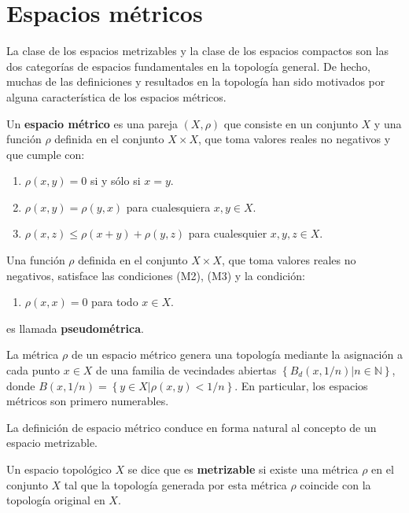 \documentclass[12pt]{report}
\theoremstyle{largebreak}
\renewcommand{\theenumi}{\arabic{enumi})}
\begin{document}
    \section{Espacios métricos}

    La clase de los espacios metrizables y la clase de los espacios compactos son las dos categorías de espacios fundamentales en la topología general. De hecho, muchas de las definiciones y resultados en la topología han sido motivados por alguna característica de los espacios métricos.

    \begin{mydef}
        Un \textbf{espacio métrico} es una pareja $(X,\rho)$ que consiste en un conjunto $X$ y una función $\rho$ definida en el conjunto $X\times X$, que toma valores reales no negativos y que cumple con:
        \renewcommand{\theenumi}{M\arabic{enumi})}
        \begin{enumerate}
            \item $\rho(x,y)=0$ si y sólo si $x=y$.
            \item $\rho(x,y)=\rho(y,x)$ para cualesquiera $x,y\in X$.
            \item $\rho(x,z)\leq\rho(x+y)+\rho(y,z)$ para cualesquier $x,y,z\in X$.
        \end{enumerate}
        Una función $\rho$ definida en el conjunto $X\times X$, que toma valores reales no negativos, satisface las condiciones (M2), (M3) y la condición:
        \renewcommand{\theenumi}{M\arabic{enumi}')}
        \begin{enumerate}
            \item $\rho(x,x)=0$ para todo $x\in X$.
        \end{enumerate}
        es llamada \textbf{pseudométrica}.
    \end{mydef}

    \renewcommand{\theenumi}{\arabic{enumi})}

    La métrica $\rho$ de un espacio métrico genera una topología mediante la asignación a cada punto $x\in X$ de una familia de vecindades abiertas $\left\{B_d(x,1/n)\big| n\in\mathbb{N} \right\}$, donde $B(x,1/n)=\left\{y\in X\big| \rho(x,y)<1/n \right\}$. En particular, los espacios métricos son primero numerables.

    La definición de espacio métrico conduce en forma natural al concepto de un espacio metrizable.

    \begin{mydef}
        Un espacio topológico $X$ se dice que es \textbf{metrizable} si existe una métrica $\rho$ en el conjunto $X$ tal que la topología generada por esta métrica $\rho$ coincide con la topología original en $X$.
    \end{mydef}
\end{document}
